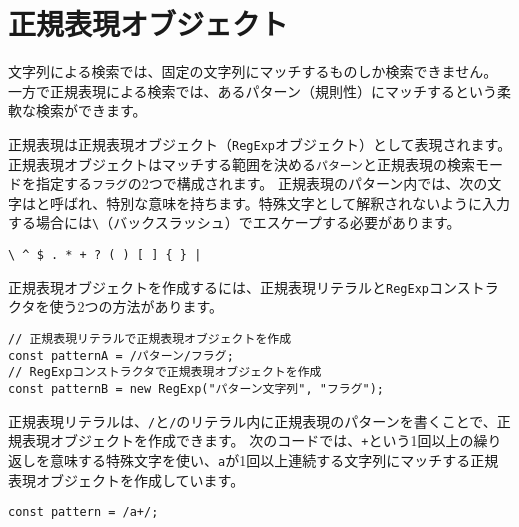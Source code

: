 \hypertarget{regexp-object}{%
\section{正規表現オブジェクト}\label{regexp-object}}

文字列による検索では、固定の文字列にマッチするものしか検索できません。
一方で正規表現による検索では、あるパターン（規則性）にマッチするという柔軟な検索ができます。

正規表現は正規表現オブジェクト（\texttt{RegExp}オブジェクト）として表現されます。
正規表現オブジェクトはマッチする範囲を決める\texttt{パターン}と正規表現の検索モードを指定する\texttt{フラグ}の2つで構成されます。
正規表現のパターン内では、次の文字は\textbf{}と呼ばれ、特別な意味を持ちます。特殊文字として解釈されないように入力する場合には\texttt{\textbackslash}\index{\\@\texttt{\textbackslash}}（バックスラッシュ）でエスケープする必要があります。

\begin{lstlisting}
\ ^ $ . * + ? ( ) [ ] { } |
\end{lstlisting}

正規表現オブジェクトを作成するには、正規表現リテラルと\texttt{RegExp}コンストラクタを使う2つの方法があります。

\begin{lstlisting}
// 正規表現リテラルで正規表現オブジェクトを作成
const patternA = /パターン/フラグ;
// RegExpコンストラクタで正規表現オブジェクトを作成
const patternB = new RegExp("パターン文字列", "フラグ");
\end{lstlisting}

正規表現リテラルは、\texttt{/}と\texttt{/}のリテラル内に正規表現のパターンを書くことで、正規表現オブジェクトを作成できます。
次のコードでは、\texttt{+}という1回以上の繰り返しを意味する特殊文字を使い、\texttt{a}が1回以上連続する文字列にマッチする正規表現オブジェクトを作成しています。

\begin{lstlisting}
const pattern = /a+/;
\end{lstlisting}

